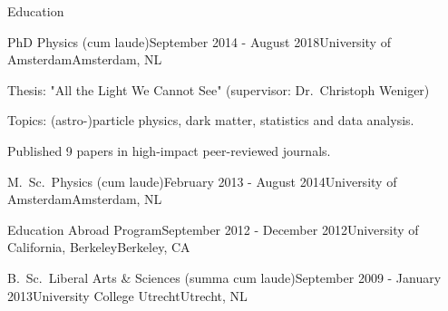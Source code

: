 \documentclass{resume} %
\begin{document}

\begin{rSection}{Education}

\begin{rSubsection}{PhD Physics (cum laude)}{September 2014 - August 2018}{University of Amsterdam}{Amsterdam, NL}
\item Thesis: "All the Light We Cannot See" (supervisor: Dr.~Christoph Weniger)
\item Topics: (astro-)particle physics, dark matter, statistics and data analysis.
\item Published 9 papers in high-impact peer-reviewed journals.
\end{rSubsection}


\begin{rSubsection}{M.~Sc.~Physics (cum laude)}{February 2013 - August 2014}{University of Amsterdam}{Amsterdam, NL}
\end{rSubsection}


\begin{rSubsection}{Education Abroad Program}{September 2012 - December 2012}{University of California, Berkeley}{Berkeley, CA}
\end{rSubsection}


\begin{rSubsection}{B.~Sc.~Liberal Arts \& Sciences (summa cum laude)}{September 2009 - January 2013}{University College Utrecht}{Utrecht, NL}
\end{rSubsection}
\end{rSection}

\end{document}
